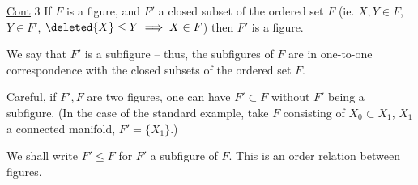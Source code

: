 \uline{Cont} 3 If $F$ is a  figure, and $F'$ a closed subset of the ordered set $F$ (ie. $X,Y\in F$, $Y\in F'$, $\deleted{X}\leq Y\implies X\in F$) then $F'$ is a figure.

We say that $F'$ is a subfigure -- thus, the subfigures of $F$ are in one-to-one correspondence with the closed subsets of the ordered set $F$.

Careful, if $F',F$ are two figures, one can have $F'\subset F$ without $F'$ being a subfigure. (In the case of the standard example, take $F$ consisting of $X_0\subset X_1$, $X_1$ a connected manifold, $F'=\{X_1\}$.)


We shall write \deleted{$\unsure{\leq|\subset}$} $F'\leq F$ for $F'$ a subfigure of $F$. This is an order relation between figures.

